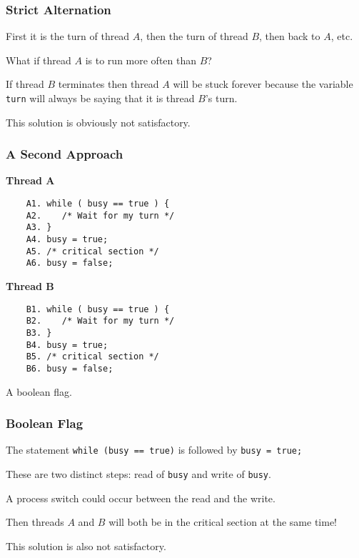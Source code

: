 \begin{frame}
	\frametitle{Strict Alternation}

	First it is the turn of thread $A$, then the turn of thread $B$, then back to $A$, etc.

	What if thread $A$ is to run more often than $B$?

	If thread $B$ terminates then thread $A$ will be stuck forever because the variable \texttt{turn} will always be saying that it is thread $B$'s turn.

	This solution is obviously not satisfactory.

\end{frame}

\begin{frame}[fragile]
	\frametitle{A Second Approach}

	\begin{multicols}{2}
		\textbf{Thread A}
		\begin{verbatim}
	A1. while ( busy == true ) {
	A2.    /* Wait for my turn */
	A3. }
	A4. busy = true;
	A5. /* critical section */
	A6. busy = false;
	\end{verbatim}
		\columnbreak
		\textbf{Thread B}
		\begin{verbatim}
	B1. while ( busy == true ) {
	B2.    /* Wait for my turn */
	B3. }
	B4. busy = true;
	B5. /* critical section */
	B6. busy = false;
	\end{verbatim}
	\end{multicols}

	A boolean flag.

\end{frame}

\begin{frame}
	\frametitle{Boolean Flag}

	The statement \texttt{while (busy == true)} is followed by \texttt{busy = true;}

	These are two distinct steps: read of \texttt{busy} and write of \texttt{busy}.

	A process switch could occur between the read and the write.

	Then threads $A$ and $B$ will both be in the critical section at the same time!

	This solution is also not satisfactory.

\end{frame}


